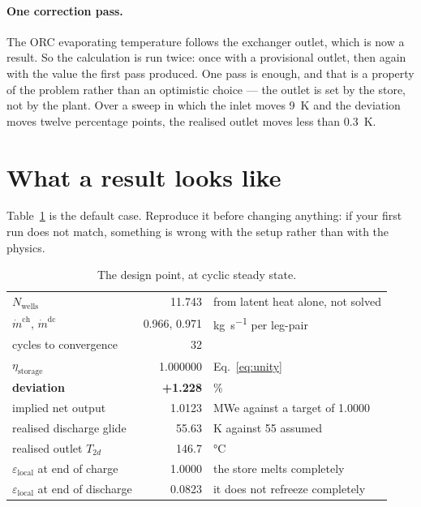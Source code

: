 \documentclass[11pt,a4paper]{article}
\providecommand{\celsius}{\degreeCelsius}
\newcommand{\md}{\ensuremath{\dot m}}
\newcommand{\Nwells}{\ensuremath{N_{\mathrm{wells}}}}
\newcommand{\epsloc}{\ensuremath{\varepsilon_{\mathrm{local}}}}
\begin{document}
\paragraph{One correction pass.}
The ORC evaporating temperature follows the exchanger outlet, which is now a
result. So the calculation is run twice: once with a provisional outlet, then
again with the value the first pass produced. One pass is enough, and that is a
property of the problem rather than an optimistic choice --- the outlet is set by
the store, not by the plant. Over a sweep in which the inlet moves
\SI{9}{\kelvin} and the deviation moves twelve percentage points, the realised
outlet moves less than \SI{0.3}{\kelvin}.

\section{What a result looks like}
\label{sec:result}

Table~\ref{tab:design} is the default case. Reproduce it before changing
anything: if your first run does not match, something is wrong with the setup
rather than with the physics.

\begin{table}[htbp]
\centering
\caption{The design point, at cyclic steady state.}
\label{tab:design}
\begin{tabular}{@{}l r l@{}}
\toprule
$\Nwells$ & 11.743 & from latent heat alone, not solved \\
$\md^{\mathrm{ch}}$, $\md^{\mathrm{dc}}$ & 0.966, 0.971 &
  \si{\kilogram\per\second} per leg-pair \\
cycles to convergence & 32 & \\
$\eta_{\mathrm{storage}}$ & 1.000000 & Eq.~\eqref{eq:unity} \\
\midrule
\textbf{deviation} & \textbf{+1.228} & \si{\percent} \\
implied net output & 1.0123 & MWe against a target of 1.0000 \\
realised discharge glide & 55.63 & \si{\kelvin} against \num{55} assumed \\
realised outlet $T_{2d}$ & 146.7 & \si{\celsius} \\
\midrule
$\epsloc$ at end of charge & 1.0000 & the store melts completely \\
$\epsloc$ at end of discharge & 0.0823 & it does not refreeze completely \\
\bottomrule
\end{tabular}
\end{table}
\end{document}
